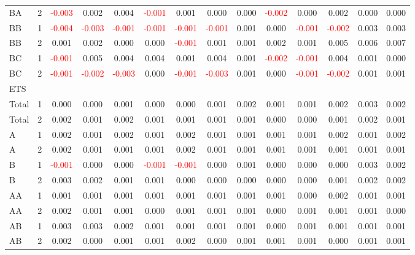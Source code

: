 \begin{table}[H]
{\begin{tabular}{llcccccccccccc}
BA & 2 & \textcolor{red}{-0.003} & 0.002 & 0.004 & \textcolor{red}{-0.001} & 0.001 & 0.000 & 0.000 & \textcolor{red}{-0.002} & 0.000 & 0.002 & 0.000 & 0.000\\
BB & 1 & \textcolor{red}{-0.004} & \textcolor{red}{-0.003} & \textcolor{red}{-0.001} & \textcolor{red}{-0.001} & \textcolor{red}{-0.001} & \textcolor{red}{-0.001} & 0.001 & 0.000 & \textcolor{red}{-0.001} & \textcolor{red}{-0.002} & 0.003 & 0.003\\
BB & 2 & 0.001 & 0.002 & 0.000 & 0.000 & \textcolor{red}{-0.001} & 0.001 & 0.001 & 0.002 & 0.001 & 0.005 & 0.006 & 0.007\\
BC & 1 & \textcolor{red}{-0.001} & 0.005 & 0.004 & 0.004 & 0.001 & 0.004 & 0.001 & \textcolor{red}{-0.002} & \textcolor{red}{-0.001} & 0.004 & 0.001 & 0.000\\
BC & 2 & \textcolor{red}{-0.001} & \textcolor{red}{-0.002} & \textcolor{red}{-0.003} & 0.000 & \textcolor{red}{-0.001} & \textcolor{red}{-0.003} & 0.001 & 0.000 & \textcolor{red}{-0.001} & \textcolor{red}{-0.002} & 0.001 & 0.001\\
\hline
ETS &  &  &  &  &  &  &  &  &  &  &  &  & \\
\hline
Total & 1 & 0.000 & 0.000 & 0.001 & 0.000 & 0.000 & 0.001 & 0.002 & 0.001 & 0.001 & 0.002 & 0.003 & 0.002\\
Total & 2 & 0.002 & 0.001 & 0.002 & 0.001 & 0.001 & 0.001 & 0.001 & 0.000 & 0.000 & 0.001 & 0.002 & 0.001\\
A & 1 & 0.002 & 0.001 & 0.002 & 0.001 & 0.002 & 0.001 & 0.001 & 0.001 & 0.001 & 0.002 & 0.001 & 0.002\\
A & 2 & 0.002 & 0.001 & 0.001 & 0.001 & 0.002 & 0.001 & 0.001 & 0.001 & 0.001 & 0.001 & 0.001 & 0.001\\
B & 1 & \textcolor{red}{-0.001} & 0.000 & 0.000 & \textcolor{red}{-0.001} & \textcolor{red}{-0.001} & 0.000 & 0.001 & 0.000 & 0.000 & 0.000 & 0.003 & 0.002\\
B & 2 & 0.003 & 0.002 & 0.001 & 0.001 & 0.000 & 0.000 & 0.000 & 0.000 & 0.000 & 0.001 & 0.002 & 0.002\\
AA & 1 & 0.001 & 0.001 & 0.001 & 0.001 & 0.001 & 0.001 & 0.001 & 0.001 & 0.000 & 0.002 & 0.001 & 0.001\\
AA & 2 & 0.002 & 0.001 & 0.001 & 0.000 & 0.001 & 0.001 & 0.001 & 0.000 & 0.001 & 0.001 & 0.001 & 0.000\\
AB & 1 & 0.003 & 0.003 & 0.002 & 0.001 & 0.001 & 0.001 & 0.001 & 0.000 & 0.001 & 0.001 & 0.001 & 0.001\\
AB & 2 & 0.002 & 0.000 & 0.001 & 0.001 & 0.002 & 0.000 & 0.001 & 0.001 & 0.001 & 0.000 & 0.001 & 0.001\\

\end{tabular}}
\end{table}
